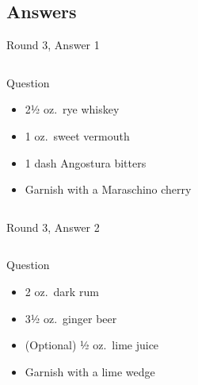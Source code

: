 \documentclass[11pt]{beamer}
\begin{document}
\subsection{Answers}
\begin{frame}[t]{Round 3, Answer 1}
\begin{columns}[T,totalwidth=\linewidth]
\begin{column}{0.32\linewidth}
\begin{block}{Question}
\begin{itemize}
\item 2½ oz.\ rye whiskey
\item 1 oz.\ sweet vermouth
\item 1 dash Angostura bitters
\item Garnish with a Maraschino cherry
\end{itemize}
\end{block}
\end{column}
\begin{column}{0.65\linewidth}
    \end{center}
}
\end{column}
\end{columns}
\end{frame}
\begin{frame}[t]{Round 3, Answer 2}
\begin{columns}[T,totalwidth=\linewidth]
\begin{column}{0.32\linewidth}
\begin{block}{Question}
\begin{itemize}
\item 2 oz.\ dark rum
\item 3½ oz.\ ginger beer
\item (Optional) ½ oz.\ lime juice
\item Garnish with a lime wedge
\end{itemize}
\end{block}
\end{column}
\begin{column}{0.65\linewidth}
    \end{center}
}
\end{column}
\end{columns}
\end{frame}
\end{document}
